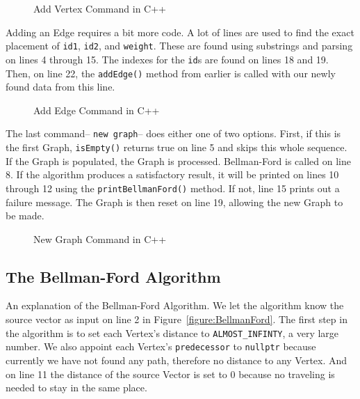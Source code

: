 \documentclass[letterpaper, 10pt,DIV=13]{scrartcl}
\numberwithin{equation}{section} %
\numberwithin{figure}{section} %
\numberwithin{table}{section} %
\begin{document}
\begin{figure}[ht] 
    \centering 
    
    \caption{Add Vertex Command in C++}
    \label{figure:AddVertex}
\end{figure}

\pagebreak

Adding an Edge requires a bit more code. A lot of lines are used to find the exact placement of \texttt{id1}, \texttt{id2}, and \texttt{weight}. These are found using substrings and parsing on lines 4 through 15. The indexes for the \texttt{id}s are found on lines 18 and 19. Then, on line 22, the \texttt{addEdge()} method from earlier is called with our newly found data from this line.

\begin{figure}[ht] 
    \centering 
    
    \caption{Add Edge Command in C++}
    \label{figure:AddEdge}
\end{figure}

The last command-- \texttt{new graph}-- does either one of two options. First, if this is the first Graph, \texttt{isEmpty()} returns true on line 5 and skips this whole sequence. If the Graph is populated, the Graph is processed. Bellman-Ford is called on line 8. If the algorithm produces a satisfactory result, it will be printed on lines 10 through 12 using the \texttt{printBellmanFord()} method. If not, line 15 prints out a failure message. The Graph is then reset on line 19, allowing the new Graph to be made.

\begin{figure}[ht] 
    \centering 
    
    \caption{New Graph Command in C++}
    \label{figure:NewGraph}
\end{figure}

\pagebreak

\subsection{The Bellman-Ford Algorithm}

An explanation of the Bellman-Ford Algorithm. We let the algorithm know the source vector as input on line 2 in Figure~\ref{figure:BellmanFord}. The first step in the algorithm is to set each Vertex's distance to \texttt{ALMOST\_INFINTY}, a very large number. We also appoint each Vertex's \texttt{predecessor} to \texttt{nullptr} because currently we have not found any path, therefore no distance to any Vertex. And on line 11 the distance of the source Vector is set to 0 because no traveling is needed to stay in the same place.
\end{document}
